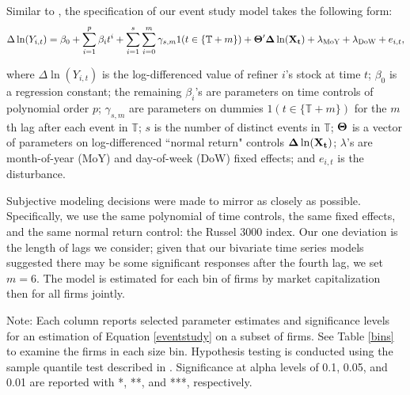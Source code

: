 \documentclass[11pt]{article}
\begin{document}
Similar to \cite{Lade2018a}, the specification of our event study model takes the following form:
\begin{equation}
\label{eventstudy}
\Delta \ln(Y_{i,t})=\beta_0 + \sum_{i=1}^{p} \beta_i t^i+\sum_{i=1}^s \sum_{i=0}^m \gamma_{s,m} 1(t\in\{\mathbb{T}+m\})+{\bf \Theta'\Delta}\ln({\bf X_t})+\lambda_{\text{MoY}}+\lambda_{\text{DoW}}+e_{i,t},
\end{equation}

\noindent where $\Delta \ln(Y_{i,t})$ is the log-differenced value of refiner $i$'s stock at time $t$; $\beta_0$ is a regression constant; the remaining $\beta_i$'s are parameters on time controls of polynomial order $p$; $\gamma_{s,m}$ are parameters on dummies $1(t\in\{\mathbb{T}+m\})$ for the $m$th lag after each event in $\mathbb{T}$; $s$ is the number of distinct events in $\mathbb{T}$; ${\bf \Theta}$ is a vector of parameters on log-differenced ``normal return" controls ${\bf \Delta}\ln({\bf X_t})$; $\lambda$'s are month-of-year (MoY) and day-of-week (DoW) fixed effects; and $e_{i,t}$ is the disturbance.

Subjective modeling decisions were made to mirror \cite{Lade2018a} as closely as possible. Specifically, we use the same polynomial of time controls, the same fixed effects, and the same normal return control: the Russel 3000 index. Our one deviation is the length of lags we consider; given that our bivariate time series models suggested there may be some significant responses after the fourth lag, we set $m=6$. The model is estimated for each bin of firms by market capitalization then for all firms jointly.

\begin{table}[!htbp] \centering 
	\caption{Results from Event Studies} 
	\label{eventstudies} 
	\begin{flushleft}
		\scriptsize{Note: Each column reports selected parameter estimates and significance levels for an estimation of Equation \ref{eventstudy} on a subset of firms. See Table \ref{bins} to examine the firms in each size bin. Hypothesis testing is conducted using the sample quantile test described in \cite{Gelbach2013}. Significance at alpha levels of 0.1, 0.05, and 0.01 are reported with *, **, and ***, respectively.}\\
	\end{flushleft}
\end{table} 
\end{document}
